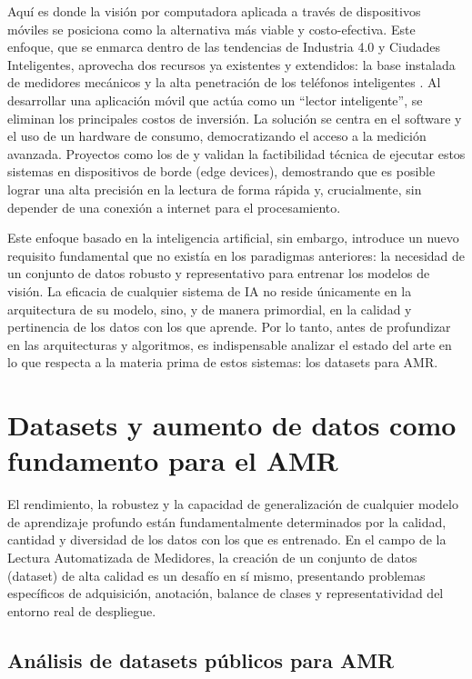 Aquí es donde la visión por computadora aplicada a través de dispositivos móviles se posiciona como la alternativa más viable y costo-efectiva. Este enfoque, que se enmarca dentro de las tendencias de Industria 4.0 y Ciudades Inteligentes, aprovecha dos recursos ya existentes y extendidos: la base instalada de medidores mecánicos y la alta penetración de los teléfonos inteligentes \parencite{Ktari2022Lightweight}. Al desarrollar una aplicación móvil que actúa como un ``lector inteligente'', se eliminan los principales costos de inversión. La solución se centra en el software y el uso de un hardware de consumo, democratizando el acceso a la medición avanzada. Proyectos como los de \parencite{Carvalho2023} y \parencite{Santiago2020Deployment} validan la factibilidad técnica de ejecutar estos sistemas en dispositivos de borde (edge devices), demostrando que es posible lograr una alta precisión en la lectura de forma rápida y, crucialmente, sin depender de una conexión a internet para el procesamiento.

Este enfoque basado en la inteligencia artificial, sin embargo, introduce un nuevo requisito fundamental que no existía en los paradigmas anteriores: la necesidad de un conjunto de datos robusto y representativo para entrenar los modelos de visión. La eficacia de cualquier sistema de IA no reside únicamente en la arquitectura de su modelo, sino, y de manera primordial, en la calidad y pertinencia de los datos con los que aprende. Por lo tanto, antes de profundizar en las arquitecturas y algoritmos, es indispensable analizar el estado del arte en lo que respecta a la materia prima de estos sistemas: los datasets para AMR.

\section{Datasets y aumento de datos como fundamento para el AMR}
\label{sec:datasets_and_augmentation}

El rendimiento, la robustez y la capacidad de generalización de cualquier modelo de aprendizaje profundo están fundamentalmente determinados por la calidad, cantidad y diversidad de los datos con los que es entrenado. En el campo de la Lectura Automatizada de Medidores, la creación de un conjunto de datos (dataset) de alta calidad es un desafío en sí mismo, presentando problemas específicos de adquisición, anotación, balance de clases y representatividad del entorno real de despliegue.

\subsection{Análisis de datasets públicos para AMR}
\label{ssec:public_datasets}

